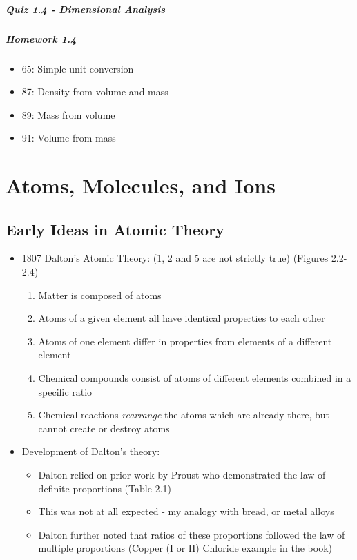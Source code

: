 \documentclass[12pt, openany, letterpaper]{memoir}
\begin{document}
\paragraph*{Quiz 1.4 - Dimensional Analysis}
\paragraph*{Homework 1.4}
\begin{itemize}
  \item 65: Simple unit conversion
  \item 87: Density from volume and mass
  \item 89: Mass from volume
  \item 91: Volume from mass
\end{itemize}

\chapter{Atoms, Molecules, and Ions}

\section{Early Ideas in Atomic Theory}
\begin{itemize}
  \item 1807 Dalton's Atomic Theory: (1, 2 and 5 are not strictly true) (Figures 2.2-2.4)
  \begin{enumerate}
    \item Matter is composed of atoms
    \item Atoms of a given element all have identical properties to each other
    \item Atoms of one element differ in properties from elements of a different element
    \item Chemical compounds consist of atoms of different elements combined in a specific ratio
    \item Chemical reactions \emph{rearrange} the atoms which are already there, but cannot create or destroy atoms
  \end{enumerate}
  \item Development of Dalton's theory:
  \begin{itemize}
    \item Dalton relied on prior work by Proust who demonstrated the law of definite proportions (Table 2.1)
    \item This was not at all expected - my analogy with bread, or metal alloys
    \item Dalton further noted that ratios of these proportions followed the law of multiple proportions (Copper (I or II) Chloride example in the book)
  \end{itemize}
\end{itemize}
\end{document}
